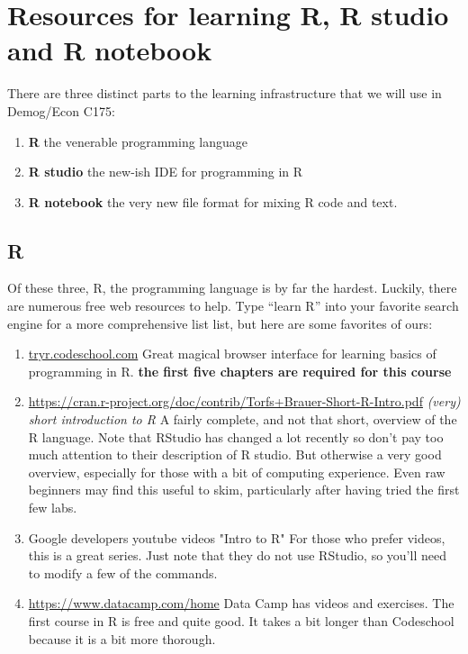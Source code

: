 \documentclass[11pt]{article}
\begin{document}
\section{Resources for learning R, R studio and R notebook}

There are three distinct parts to the learning infrastructure that we will use in Demog/Econ C175: 
\begin{enumerate}
\item \textbf{R} the venerable programming language
\item \textbf{R studio} the new-ish IDE for programming in R
\item \textbf{R notebook} the very new file format for mixing R code and text.
\end{enumerate}


\subsection{R}
\label{sec:R}

Of these three, R, the programming language is by far the hardest. Luckily, there are numerous free web resources to help.
Type ``learn R'' into your favorite search engine for a more comprehensive list list, but here are some favorites of ours:

\begin{enumerate}
\item \url{tryr.codeschool.com}  Great magical browser interface for learning basics of  programming in R. \textbf{the first five chapters are required for this course}

\item
  \url{https://cran.r-project.org/doc/contrib/Torfs+Brauer-Short-R-Intro.pdf}
  \emph{(very) short introduction to R} A fairly complete, and not
  that short, overview of the R language. Note that RStudio has
  changed a lot recently so don't pay too much attention to their
  description of R studio. But otherwise a very good overview,
  especially for those with a bit of computing experience. Even raw
  beginners may find this useful to skim, particularly after having
  tried the first few labs.

\item Google developers youtube videos "Intro to R"
For those who prefer videos, this is a great series. Just note that
they do not use RStudio, so you'll need to modify a few of the
commands. 

\item \url{https://www.datacamp.com/home} Data Camp has videos and exercises. The first course in R is free and quite good.  It takes a bit longer than Codeschool because it is a bit more thorough. 





\end{enumerate}
\end{document}
